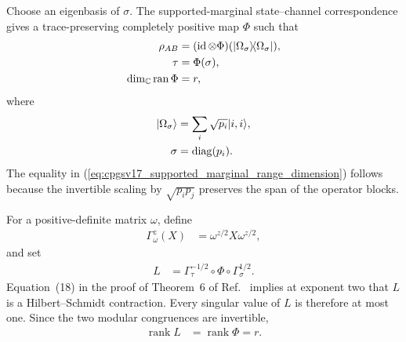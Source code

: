 \documentclass[11pt]{article}
\begin{document}
Choose an eigenbasis of $\sigma$. The supported-marginal state--channel
correspondence gives a trace-preserving completely positive map $\Phi$ such
that
\begin{align}
    \rho_{AB}
        &= (\operatorname{id}\otimes\Phi)
            (|\Omega_\sigma\rangle\!\langle \Omega_\sigma|),
    \label{eq:cpgsv17_supported_marginal_reconstruction}\\
    \tau
        &= \Phi(\sigma),
    \label{eq:cpgsv17_supported_marginal_output}\\
    \dim_{\mathbb C}\operatorname{ran}\Phi
        &= r,
    \label{eq:cpgsv17_supported_marginal_range_dimension}
\end{align}
where
\begin{align}
    |\Omega_\sigma\rangle
        &= \sum_i\sqrt{p_i}|i,i\rangle,
    \label{eq:cpgsv17_weighted_maximally_entangled_vector}\\
    \sigma
        &= \operatorname{diag}(p_i).
    \label{eq:cpgsv17_first_marginal_diagonalization}
\end{align}
The equality in
(\ref{eq:cpgsv17_supported_marginal_range_dimension}) follows because the
invertible scaling by $\sqrt{p_ip_j}$ preserves the span of the operator
blocks.

For a positive-definite matrix $\omega$, define
\begin{align}
    \Gamma_\omega^z(X)
        &= \omega^{z/2}X\omega^{z/2},
    \label{eq:cpgsv17_modular_congruence}
\end{align}
and set
\begin{align}
    L
        &= \Gamma_\tau^{-1/2}
            \circ\Phi
            \circ\Gamma_\sigma^{1/2}.
    \label{eq:cpgsv17_weighted_hilbert_schmidt_map}
\end{align}
Equation~(18) in the proof of Theorem~6 of Ref.~\cite{Beigi2013Sandwiched}
implies at exponent two that $L$ is a Hilbert--Schmidt contraction. Every
singular value of $L$ is therefore at most one. Since the two modular
congruences are invertible,
\begin{align}
    \operatorname{rank}L
        &= \operatorname{rank}\Phi
        = r.
    \label{eq:cpgsv17_weighted_map_rank}
\end{align}
\end{document}
